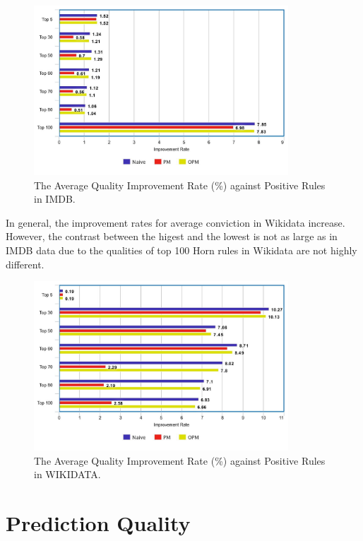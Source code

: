 \begin{figure}[ht]
\centering
\includegraphics[width=0.85\textwidth]{figures/table_1_5_imdb.jpeg}
\caption{The Average Quality Improvement Rate (\%) against Positive Rules in IMDB.}
\label{fig_1_5_imdb}
\end{figure}

In general, the improvement rates for average conviction in Wikidata increase. However, the contrast between the higest and the lowest is not as large as in IMDB data due to the qualities of top 100 Horn rules in Wikidata are not highly different.

\begin{figure}[ht]
\centering
\includegraphics[width=0.85\textwidth]{figures/table_1_5_wikidata.jpeg}
\caption{The Average Quality Improvement Rate (\%) against Positive Rules in WIKIDATA.}
\label{fig_1_5_wikidata}
\end{figure}

\section{Prediction Quality}

